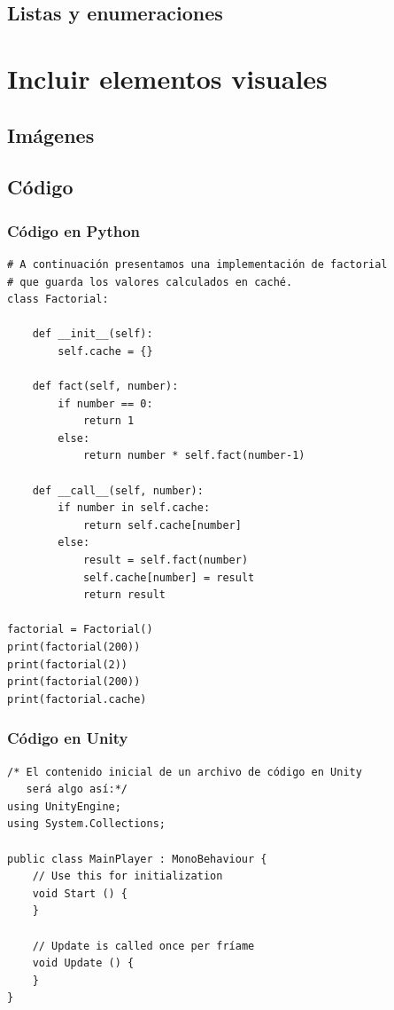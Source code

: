 \documentclass[twoside]{urjc-tfg}
\begin{document}
\subsection{Listas y enumeraciones}

\section{Incluir elementos visuales}

\subsection{Imágenes}
\label{sec:image}

\subsection{Código}

\subsubsection{Código en Python}

\begin{lstlisting}[style=Python]
# A continuación presentamos una implementación de factorial
# que guarda los valores calculados en caché.
class Factorial:

    def __init__(self):
        self.cache = {}

    def fact(self, number):
        if number == 0:
            return 1
        else:
            return number * self.fact(number-1)

    def __call__(self, number):
        if number in self.cache:
            return self.cache[number]
        else:
            result = self.fact(number)
            self.cache[number] = result
            return result

factorial = Factorial()
print(factorial(200))
print(factorial(2))
print(factorial(200))
print(factorial.cache)
\end{lstlisting}


\subsubsection{Código en Unity}

\begin{lstlisting}[style=Unity]
/* El contenido inicial de un archivo de código en Unity
   será algo así:*/
using UnityEngine;
using System.Collections;

public class MainPlayer : MonoBehaviour {
    // Use this for initialization
    void Start () {
    }
  
    // Update is called once per fríame
    void Update () {
    }
}
\end{lstlisting}
\end{document}
